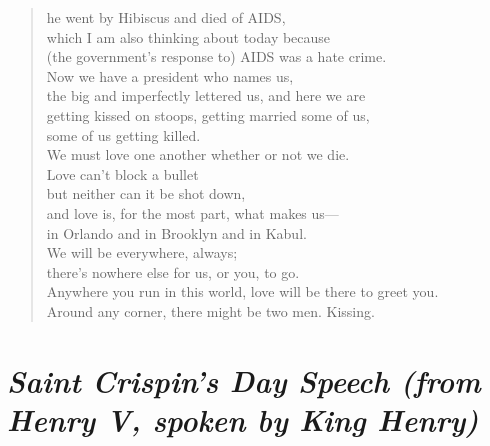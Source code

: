 \documentclass[12pt, openany, letterpaper]{memoir}
\begin{document}
\begin{verse}
	he went by Hibiscus and died of AIDS,\\
	which I am also thinking about today because\\
	(the government's response to) AIDS was a hate crime.\\
	Now we have a president who names us,\\
	the big and imperfectly lettered us, and here we are\\
	getting kissed on stoops, getting married some of us,\\
	some of us getting killed.\\
	We must love one another whether or not we die.\\
	Love can't block a bullet\\
	but neither can it be shot down,\\
	and love is, for the most part, what makes us—\\
	in Orlando and in Brooklyn and in Kabul.\\
	We will be everywhere, always;\\
	there's nowhere else for us, or you, to go.\\
	Anywhere you run in this world, love will be there to greet you.\\
	Around any corner, there might be two men. Kissing.
\end{verse}

\newpage
\section*{\emph{Saint Crispin's Day Speech (from \emph{Henry V}, spoken by King Henry)}}
\end{document}
